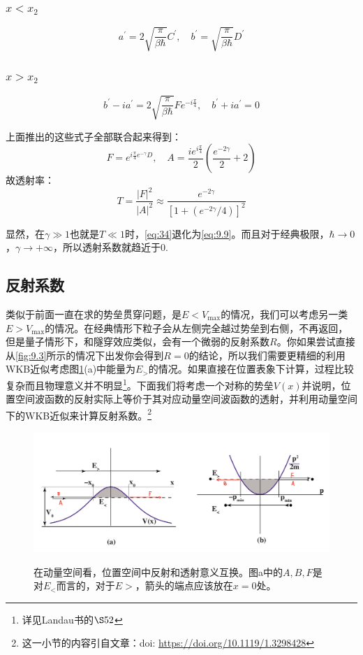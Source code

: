 \documentclass[a4paper,zihao=-4,linespread=1]{ctexrep}
\newcommand{\DOI}[1]{doi: \href{https://doi.org/#1}{#1}} %
\begin{document}
    \subsubsection*{$x<x_2$}
    \begin{equation}
        a^\prime=2\sqrt{\frac{\pi}{\beta\hbar}}C^\prime,\quad b^\prime=\sqrt{\frac{\pi}{\beta\hbar}}D^\prime
    \end{equation}
    \subsubsection*{$x>x_2$}
    \begin{equation}
        b^\prime-ia^\prime = 2\sqrt{\frac{\pi}{\beta\hbar}}Fe^{-i\frac{\pi}{4}},\quad b^\prime+ia^\prime=0
    \end{equation}
    
    上面推出的这些式子全部联合起来得到：
    \begin{equation}
        F=e^{i\frac{\pi}{4}e^{-\gamma}D},\quad A=\frac{ie^{i\frac{\pi}{4}}}{2}\left(\frac{e^{-2\gamma}}{2}+2\right)
    \end{equation}
    故透射率：
    \begin{equation}
        \label{eq:34}
        \boxed{
            T=\frac{|F|^2}{|A|^2}\approx \frac{e^{-2\gamma}}{\left[1+\left(e^{-2\gamma}/4\right)\right]^2}
        }
    \end{equation}

    显然，在$\gamma\gg 1$也就是$T\ll 1$时，\ref{eq:34}退化为\ref{eq:9.9}。而且对于经典极限，$\hbar\to 0$，$\gamma\to+\infty$，所以透射系数就趋近于0.
    
    \subsection*{反射系数}
    类似于前面一直在求的势垒贯穿问题，是$E<V_{\max}$的情况，我们可以考虑另一类$E>V_{\max}$的情况。在经典情形下粒子会从左侧完全越过势垒到右侧，不再返回，但是量子情形下，和隧穿效应类似，会有一个微弱的反射系数$R$。你如果尝试直接从\ref{fig:9.3}所示的情况下出发你会得到$R=0$的结论，所以我们需要更精细的利用WKB近似考虑图\ref{fig:9.7}(a)中能量为$E_>$的情况。如果直接在位置表象下计算，过程比较复杂而且物理意义并不明显\footnote{详见Landau书的$\S 52$}。下面我们将考虑一个对称的势垒$V(x)$并说明，位置空间波函数的反射实际上等价于其对应动量空间波函数的透射，并利用动量空间下的WKB近似来计算反射系数。\footnote{这一小节的内容引自文章：\DOI{https://doi.org/10.1119/1.3298428}}
    \begin{figure}
    	\centering
    	\includegraphics[width=0.8\linewidth]{fig/9-7.pdf}
    	\label{fig:9.7}
    	\caption{在动量空间看，位置空间中反射和透射意义互换。图a中的$A,B,F$是对$E_<$而言的，对于$E>$，箭头的端点应该放在$x=0$处。}
    \end{figure}
    
\end{document}
